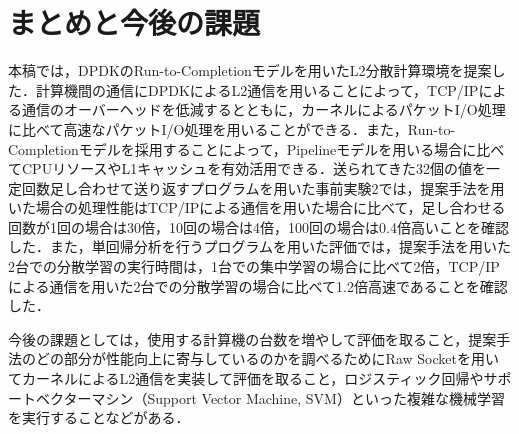 \section{まとめと今後の課題}
\label{sec:Conclusion}
本稿では，DPDKのRun-to-Completionモデルを用いたL2分散計算環境を提案した．計算機間の通信にDPDKによるL2通信を用いることによって，TCP/IPによる通信のオーバーヘッドを低減するとともに，カーネルによるパケットI/O処理に比べて高速なパケットI/O処理を用いることができる．また，Run-to-Completionモデルを採用することによって，Pipelineモデルを用いる場合に比べてCPUリソースやL1キャッシュを有効活用できる．送られてきた32個の値を一定回数足し合わせて送り返すプログラムを用いた事前実験2では，提案手法を用いた場合の処理性能はTCP/IPによる通信を用いた場合に比べて，足し合わせる回数が1回の場合は30倍，10回の場合は4倍，100回の場合は0.4倍高いことを確認した．また，単回帰分析を行うプログラムを用いた評価では，提案手法を用いた2台での分散学習の実行時間は，1台での集中学習の場合に比べて2倍，TCP/IPによる通信を用いた2台での分散学習の場合に比べて1.2倍高速であることを確認した．

今後の課題としては，使用する計算機の台数を増やして評価を取ること，提案手法のどの部分が性能向上に寄与しているのかを調べるためにRaw Socketを用いてカーネルによるL2通信を実装して評価を取ること，ロジスティック回帰やサポートベクターマシン（Support Vector Machine, SVM）といった複雑な機械学習を実行することなどがある．
